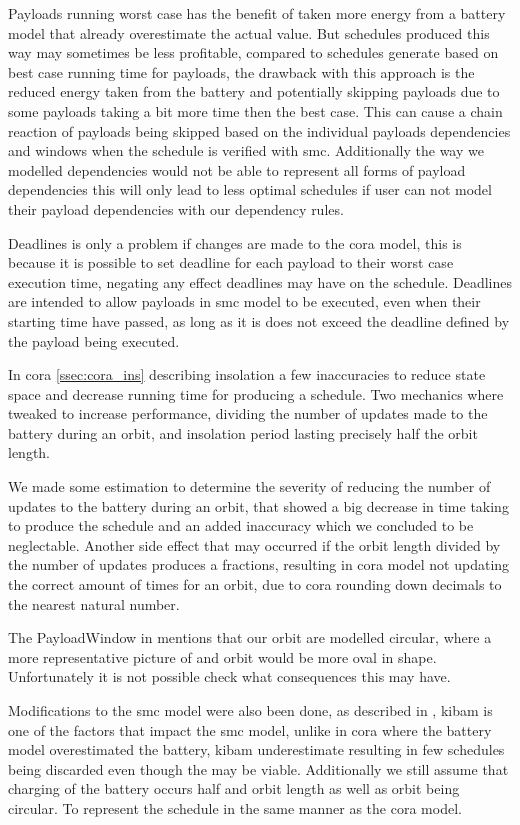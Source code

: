 Payloads running worst case has the benefit of taken more energy from a battery model that already overestimate the actual value. But schedules produced this way may sometimes be less profitable, compared to schedules generate based on best case running time for payloads, the drawback with this approach is the reduced energy taken from the battery and potentially skipping payloads due to some payloads taking a bit more time then the best case. This can cause a chain reaction of payloads being skipped based on the individual payloads dependencies and windows when the schedule is verified with \gls{smc}. Additionally the way we modelled dependencies would not be able to represent all forms of payload dependencies this will only lead to less optimal schedules if user can not model their payload dependencies with our dependency rules.

Deadlines is only a problem if changes are made to the \gls{cora} model, this is because it is possible to set deadline for each payload to their worst case execution time, negating any effect deadlines may have on the schedule. Deadlines are intended to allow payloads in \gls{smc} model to be executed, even when their starting time have passed, as long as it is does not exceed the deadline defined by the payload being executed.

In \gls{cora} \cref{ssec:cora_ins} describing insolation a few inaccuracies to reduce state space and decrease running time for producing a schedule. Two mechanics where tweaked to increase performance, dividing the number of updates made to the battery during an orbit, and insolation period lasting precisely half the orbit length.

We made some estimation to determine the severity of reducing the number of updates to the battery during an orbit, that showed a big decrease in time taking to produce the schedule and an added inaccuracy which we concluded to be neglectable. Another side effect that may occurred  if the orbit length divided by the number of updates produces a fractions, resulting in \gls{cora} model not updating the correct amount of times for an orbit, due to \gls{cora}  rounding down decimals to the nearest natural number.

The PayloadWindow in  mentions that our orbit are modelled circular, where a more representative picture of and orbit would be more oval in shape. Unfortunately it is not possible check what consequences this may have.

Modifications to the \gls{smc} model were also been done, as described in , \gls{kibam} is one of the factors that impact the \gls{smc} model, unlike in \gls{cora} where the battery model overestimated the battery, \gls{kibam} underestimate resulting in few schedules being discarded even though the may be viable. Additionally we still assume that charging of the battery occurs half and orbit length as well as orbit being circular. To represent the schedule in the same manner as the \gls{cora} model.

